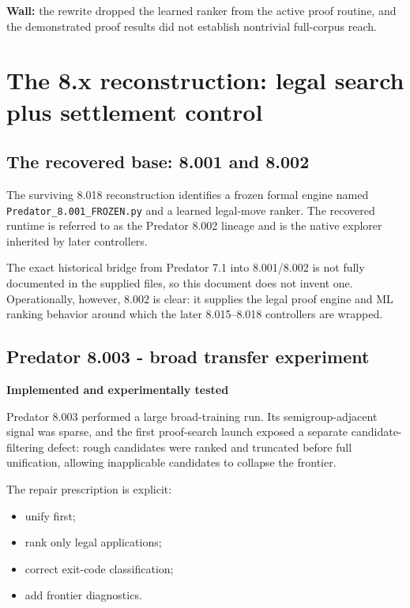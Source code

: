 \documentclass[11pt]{article}
\newcommand{\tested}{\textbf{Implemented and experimentally tested}}
\begin{document}
\textbf{Wall:} the rewrite dropped the learned ranker from the active proof routine, and the demonstrated proof results did not establish nontrivial full-corpus reach.

\section{The 8.x reconstruction: legal search plus settlement control}

\subsection{The recovered base: 8.001 and 8.002}

The surviving 8.018 reconstruction identifies a frozen formal engine named \texttt{Predator\_8.001\_FROZEN.py} and a learned legal-move ranker. The recovered runtime is referred to as the Predator 8.002 lineage and is the native explorer inherited by later controllers.

The exact historical bridge from Predator 7.1 into 8.001/8.002 is not fully documented in the supplied files, so this document does not invent one. Operationally, however, 8.002 is clear: it supplies the legal proof engine and ML ranking behavior around which the later 8.015--8.018 controllers are wrapped.

\subsection{Predator 8.003 - broad transfer experiment}

\begin{statusbox}\tested\end{statusbox}

Predator 8.003 performed a large broad-training run. Its semigroup-adjacent signal was sparse, and the first proof-search launch exposed a separate candidate-filtering defect: rough candidates were ranked and truncated before full unification, allowing inapplicable candidates to collapse the frontier.

The repair prescription is explicit:
\begin{itemize}
\item unify first;
\item rank only legal applications;
\item correct exit-code classification;
\item add frontier diagnostics.
\end{itemize}
\end{document}
